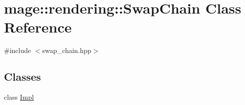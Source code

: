 \hypertarget{classmage_1_1rendering_1_1_swap_chain}{}\section{mage\+:\+:rendering\+:\+:Swap\+Chain Class Reference}
\label{classmage_1_1rendering_1_1_swap_chain}


{\ttfamily \#include $<$swap\+\_\+chain.\+hpp$>$}

\subsection*{Classes}
\begin{DoxyCompactItemize}
\item 
class \hyperlink{classmage_1_1rendering_1_1_swap_chain_1_1_impl}{Impl}
\end{DoxyCompactItemize}
